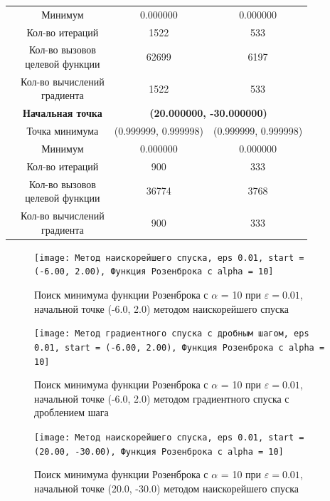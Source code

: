 \begin{table}[H]
\begin{tabular}{|c|c|c|c|}
	\cline{2-4}
	&Минимум &0.000000 &0.000000 \\ 
	\cline{2-4}
	&Кол-во итераций &1522 &533 \\ 
	\cline{2-4}
	&\makecell{Кол-во вызовов\\целевой функции} &62699 &6197 \\ 
	\cline{2-4}
	&\makecell{Кол-во вычислений\\градиента} &1522 &533 \\ 
	\cline{2-4}
\cline{2-4}&\textbf{Начальная точка} &\multicolumn{2}{c|}{\textbf{(20.000000, -30.000000)}}\\
	\cline{2-4}
	&Точка минимума &(0.999999, 0.999998) &(0.999999, 0.999998) \\ 
	\cline{2-4}
	&Минимум &0.000000 &0.000000 \\ 
	\cline{2-4}
	&Кол-во итераций &900 &333 \\ 
	\cline{2-4}
	&\makecell{Кол-во вызовов\\целевой функции} &36774 &3768 \\ 
	\cline{2-4}
	&\makecell{Кол-во вычислений\\градиента} &900 &333 \\ 
	\cline{2-4}
	\hline

\end{tabular}
\end{table}


            \begin{figure}[H]
	        \centering
	        \texttt{[image: Метод наискорейшего спуска, eps 0.01, start = (-6.00, 2.00), Функция Розенброка с alpha = 10]}%
	        \caption{Поиск минимума функции Розенброка с $\alpha$ = 10 при $\varepsilon = 0.01$, начальной точке (-6.0, 2.0) методом наискорейшего спуска}
	        \vspace*{-1.2cm}
            \end{figure}
            
            \begin{figure}[H]
	        \centering
	        \texttt{[image: Метод градиентного спуска с дробным шагом, eps 0.01, start = (-6.00, 2.00), Функция Розенброка с alpha = 10]}%
	        \caption{Поиск минимума функции Розенброка с $\alpha$ = 10 при $\varepsilon = 0.01$, начальной точке (-6.0, 2.0) методом градиентного спуска с дроблением шага}
	        \vspace*{-1.2cm}
            \end{figure}
            
            \begin{figure}[H]
	        \centering
	        \texttt{[image: Метод наискорейшего спуска, eps 0.01, start = (20.00, -30.00), Функция Розенброка с alpha = 10]}%
	        \caption{Поиск минимума функции Розенброка с $\alpha$ = 10 при $\varepsilon = 0.01$, начальной точке (20.0, -30.0) методом наискорейшего спуска}
	        \vspace*{-1.2cm}
            \end{figure}
            
